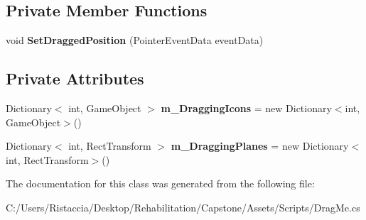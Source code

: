 \subsection*{Private Member Functions}
\begin{DoxyCompactItemize}
\item 
\mbox{\label{class_drag_me_aaeb796da52953dbf9b74ca29d9b435d6}} 
void {\bfseries Set\+Dragged\+Position} (Pointer\+Event\+Data event\+Data)
\end{DoxyCompactItemize}
\subsection*{Private Attributes}
\begin{DoxyCompactItemize}
\item 
\mbox{\label{class_drag_me_a0afa93e7aa03f70f8f3d525a63c110bf}} 
Dictionary$<$ int, Game\+Object $>$ {\bfseries m\+\_\+\+Dragging\+Icons} = new Dictionary$<$int, Game\+Object$>$()
\item 
\mbox{\label{class_drag_me_a6e6db46cec575d460d6f94870a16eaba}} 
Dictionary$<$ int, Rect\+Transform $>$ {\bfseries m\+\_\+\+Dragging\+Planes} = new Dictionary$<$int, Rect\+Transform$>$()
\end{DoxyCompactItemize}


The documentation for this class was generated from the following file\+:\begin{DoxyCompactItemize}
\item 
C\+:/\+Users/\+Ristaccia/\+Desktop/\+Rehabilitation/\+Capstone/\+Assets/\+Scripts/Drag\+Me.\+cs\end{DoxyCompactItemize}
